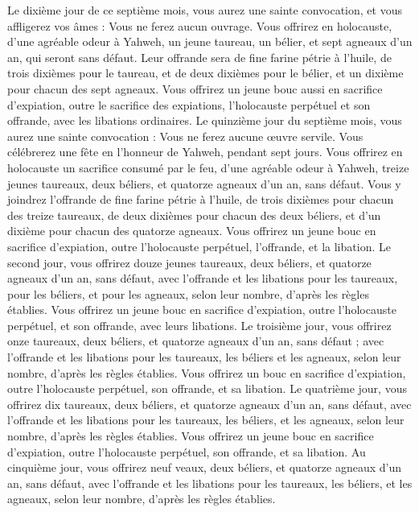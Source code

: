 \begin{multicols}{2}
Le dixième jour de ce septième mois, vous aurez une sainte convocation, et vous affligerez vos âmes : Vous ne ferez aucun ouvrage.
Vous offrirez en holocauste, d’une agréable odeur à Yahweh, un jeune taureau, un bélier, et sept agneaux d'un an, qui seront sans défaut.
Leur offrande sera de fine farine pétrie à l'huile, de trois dixièmes pour le taureau, et de deux dixièmes pour le bélier,
et un dixième pour chacun des sept agneaux.
Vous offrirez un jeune bouc aussi en sacrifice d’expiation, outre le sacrifice des expiations, l'holocauste perpétuel et son offrande, avec les libations ordinaires.
Le quinzième jour du septième mois, vous aurez une sainte convocation : Vous ne ferez aucune œuvre servile. Vous célébrerez une fête en l’honneur de Yahweh, pendant sept jours.
Vous offrirez en holocauste un sacrifice consumé par le feu, d’une agréable odeur à Yahweh, treize jeunes taureaux, deux béliers, et quatorze agneaux d'un an, sans défaut.
Vous y joindrez l’offrande de fine farine pétrie à l'huile, de trois dixièmes pour chacun des treize taureaux, de deux dixièmes pour chacun des deux béliers,
et d'un dixième pour chacun des quatorze agneaux.
Vous offrirez un jeune bouc en sacrifice d’expiation, outre l'holocauste perpétuel, l’offrande, et la libation.
Le second jour, vous offrirez douze jeunes taureaux, deux béliers, et quatorze agneaux d'un an, sans défaut,
avec l’offrande et les libations pour les taureaux, pour les béliers, et pour les agneaux, selon leur nombre, d’après les règles établies.
Vous offrirez un jeune bouc en sacrifice d’expiation, outre l'holocauste perpétuel, et son offrande, avec leurs libations.
Le troisième jour, vous offrirez onze taureaux, deux béliers, et quatorze agneaux d'un an, sans défaut ;
avec l’offrande et les libations pour les taureaux, les béliers et les agneaux, selon leur nombre, d’après les règles établies.
Vous offrirez un bouc en sacrifice d’expiation, outre l'holocauste perpétuel, son offrande, et sa libation.
Le quatrième jour, vous offrirez dix taureaux, deux béliers, et quatorze agneaux d'un an, sans défaut,
avec l’offrande et les libations pour les taureaux, les béliers, et les agneaux, selon leur nombre, d’après les règles établies.
Vous offrirez un jeune bouc en sacrifice d’expiation, outre l'holocauste perpétuel, son offrande, et sa libation.
Au cinquième jour, vous offrirez neuf veaux, deux béliers, et quatorze agneaux d'un an, sans défaut,
avec l’offrande et les libations pour les taureaux, les béliers, et les agneaux, selon leur nombre, d’après les règles établies.

\end{multicols}
